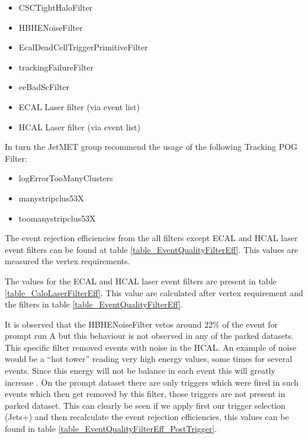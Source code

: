 \begin{itemize}
  \item CSCTightHaloFilter
  \item HBHENoiseFilter
  \item EcalDeadCellTriggerPrimitiveFilter
  \item trackingFailureFilter
  \item eeBadScFilter
  \item ECAL Laser filter (via event list)
  \item HCAL Laser filter (via event list)
\end{itemize}

In turn the JetMET group recommend the usage of the following Tracking POG Filter\cite{CMS:TrackingPOG:TrackingPOGFilters}:

\begin{itemize}
  \item  logErrorTooManyClusters
  \item  manystripclus53X
  \item  toomanystripclus53X
\end{itemize}

The event rejection efficiencies from the all filters except ECAL and HCAL laser event filters can be found at table \ref{table_EventQualityFilterEff}. This values are measured the vertex requirements. 



The values for the ECAL and HCAL laser event filters are present in table \ref{table_CaloLaserFilterEff}. This value are calculated after vertex requirement and the filters in table \ref{table_EventQualityFilterEff}. 



It is observed that the HBHENoiseFilter vetos around 22\% of the event for prompt run A but this behaviour is not observed in any of the parked datasets. This specific filter removed events with noise in the HCAL. An example of noise would be a ``hot tower'' reading very high energy values, some times for several events. Since this energy will not be balance in each event this will greatly increase \MET. On the prompt dataset there are \MET only triggers which were fired in such events which then get removed by this filter, those triggers are not present in parked dataset. This can clearly be seen if we apply first our trigger selection (Jets+\MET) and then recalculate the event rejection efficiencies, this values can be found in table \ref{table_EventQualityFilterEff_PostTrigger}.

